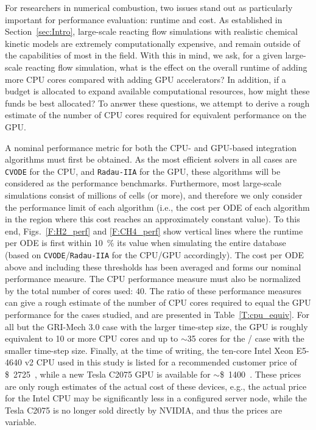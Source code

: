 \documentclass[preprint]{elsarticle}
\begin{document}
For researchers in numerical combustion, two issues stand out as particularly important for performance evaluation: runtime and cost.
As established in Section~\ref{sec:Intro}, large-scale reacting flow simulations with realistic chemical kinetic models are extremely computationally expensive, and remain outside of the capabilities of most in the field.
With this in mind, we ask, for a given large-scale reacting flow simulation, what is the effect on the overall runtime of adding more CPU cores compared with adding GPU accelerators?
In addition, if a budget is allocated to expand available computational resources, how might these funds be best allocated?
To answer these questions, we attempt to derive a rough estimate of the number of CPU cores required for equivalent performance on the GPU.

A nominal performance metric for both the CPU- and GPU-based integration algorithms must first be obtained.
As the most efficient solvers in all cases are \texttt{CVODE} for the CPU, and \texttt{Radau-IIA} for the GPU, these algorithms will be considered as the performance benchmarks.
Furthermore, most large-scale simulations consist of millions of cells (or more), and therefore we only consider the performance limit of each algorithm (i.e., the cost per ODE of each algorithm in the region where this cost reaches an approximately constant value).
To this end, Figs.~\ref{F:H2_perf} and \ref{F:CH4_perf} show vertical lines where the runtime per ODE is first within \SI{10}{\percent} its value when simulating the entire database (based on \texttt{CVODE}\slash\texttt{Radau-IIA} for the CPU\slash GPU accordingly).
The cost per ODE above and including these thresholds has been averaged and forms our nominal performance measure.
The CPU performance measure must also be normalized by the total number of cores used: \num{40}.
The ratio of these performance measures can give a rough estimate of the number of CPU cores required to equal the GPU performance for the cases studied, and are presented in Table~\ref{T:cpu_equiv}.
For all but the GRI-Mech 3.0 case with the larger time-step size, the GPU is roughly equivalent to \num{10} or more CPU cores and up to $\sim$\num{35} cores for the \slash{} case with the smaller time-step size.
Finally, at the time of writing, the ten-core Intel Xeon E5-4640 v2 CPU used in this study is listed for a recommended customer price of \SI{2725}[\$]{}~\cite{intel_price}, while a new Tesla C2075 GPU is available for $\sim$\SI{1400}[\$]{}~\cite{gpu_price}.
These prices are only rough estimates of the actual cost of these devices, e.g., the actual price for the Intel CPU may be significantly less in a configured server node, while the Tesla C2075 is no longer sold directly by NVIDIA, and thus the prices are variable.
\end{document}
